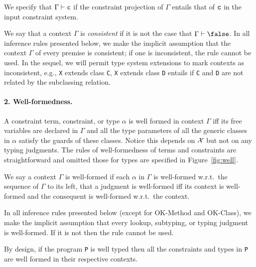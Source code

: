We specify that $\Gamma\vdash{\tt c}$ if the constraint projection of $\Gamma$ entails that of $\tt c$ in the input constraint system. %

We say that a context $\Gamma$ is {\em consistent} if it is not the case that $\Gamma\vdash\false$.
In all inference rules presented below, we make the implicit assumption that the context $\Gamma$ of every premise is consistent; if one is inconsistent, the rule cannot be used. In the sequel, we will permit type system extensions to mark contexts as inconsistent, e.g., {\tt X} extends class {\tt C}, {\tt X} extends class {\tt D} entails \false{} if {\tt C} and {\tt D} are not related by the subclassing relation.


\paragraph{2. Well-formedness.} A constraint term, constraint, or type $\alpha$ is well formed in context $\Gamma$ iff its free variables are declared in $\Gamma$ and all the type parameters of all the generic classes in $\alpha$ satisfy the guards of these classes. Notice this depends on $\cal X$ but not on any typing judgments. The rules of well-formedness of terms and constraints are straightforward and omitted those for types are specified in Figure~\ref{fig:well}. 

We say a context $\Gamma$ is well-formed if each $\alpha$ in $\Gamma$ is well-formed w.r.t.\ the sequence of $\Gamma$ to its left, that a judgment is well-formed iff its context is well-formed and the consequent is well-formed w.r.t.\ the context.

In all inference rules presented below (except for {\sc OK-Method} and {\sc OK-Class}), we make the implicit assumption that every lookup, subtyping, or typing judgment is well-formed. If it is not then the rule cannot be used.

By design, if the program {\tt P} is well typed then all the constraints and types in {\tt P} are well formed in their respective contexts.

